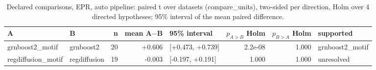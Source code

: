 \begin{table}[H]\centering\small
\caption{Declared comparisons, EPR, auto pipeline: paired t over datasets (compare\_units), two-sided per direction, Holm over 4 directed hypotheses; 95\% interval of the mean paired difference.}
\begin{tabular}{llrrlrrl}\toprule
A & B & n & mean A$-$B & 95\% interval & $p_{A>B}$ Holm & $p_{B>A}$ Holm & supported \\ \midrule
grnboost2\_motif & grnboost2 & 20 & +0.606 & [+0.473, +0.739] & 2.2e-08 & 1.000 & grnboost2\_motif \\
regdiffusion\_motif & regdiffusion & 19 & -0.003 & [-0.197, +0.191] & 1.000 & 1.000 & unresolved \\
\bottomrule\end{tabular}\end{table}
